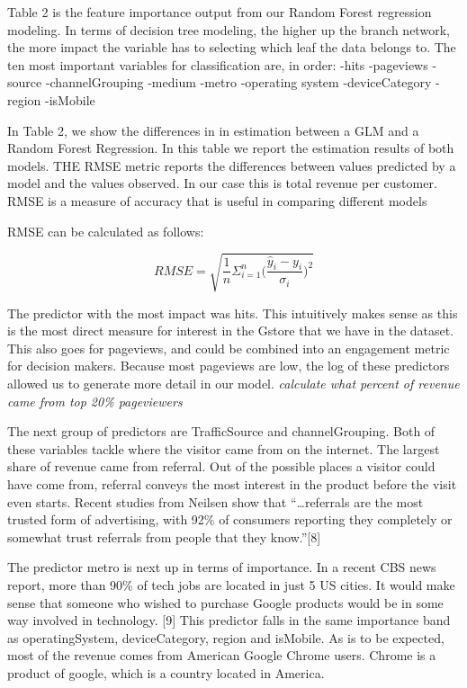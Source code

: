 \documentclass[]{tufte-handout}
\begin{document}
Table 2 is the feature importance output from our Random Forest
regression modeling. In terms of decision tree modeling, the higher up
the branch network, the more impact the variable has to selecting which
leaf the data belongs to. The ten most important variables for
classification are, in order: -hits -pageviews -source -channelGrouping
-medium -metro -operating system -deviceCategory -region -isMobile

In Table 2, we show the differences in in estimation between a GLM and a
Random Forest Regression. In this table we report the estimation results
of both models. THE RMSE metric reports the differences between values
predicted by a model and the values observed. In our case this is total
revenue per customer. RMSE is a measure of accuracy that is useful in
comparing different models

RMSE can be calculated as follows:

\[ RMSE = \sqrt{\frac{1}{n}\Sigma_{i=1}^{n}{\Big(\frac{\hat{y}_i -y_i}{\sigma_i}\Big)^2}}\]

The predictor with the most impact was hits. This intuitively makes
sense as this is the most direct measure for interest in the Gstore that
we have in the dataset. This also goes for pageviews, and could be
combined into an engagement metric for decision makers. Because most
pageviews are low, the log of these predictors allowed us to generate
more detail in our model. \emph{calculate what percent of revenue came
from top 20\% pageviewers}

The next group of predictors are TrafficSource and channelGrouping. Both
of these variables tackle where the visitor came from on the internet.
The largest share of revenue came from referral. Out of the possible
places a visitor could have come from, referral conveys the most
interest in the product before the visit even starts. Recent studies
from Neilsen show that ``\ldots referrals are the most trusted form of
advertising, with 92\% of consumers reporting they completely or
somewhat trust referrals from people that they know.''{[}8{]}

The predictor metro is next up in terms of importance. In a recent CBS
news report, more than 90\% of tech jobs are located in just 5 US
cities. It would make sense that someone who wished to purchase Google
products would be in some way involved in technology. {[}9{]} This
predictor falls in the same importance band as operatingSystem,
deviceCategory, region and isMobile. As is to be expected, most of the
revenue comes from American Google Chrome users. Chrome is a product of
google, which is a country located in America.
\end{document}
